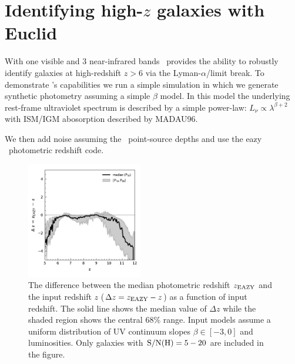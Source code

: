 

\section{Identifying high-$z$ galaxies with Euclid}

With one visible and 3 near-infrared bands \euclid\ provides the ability to robustly identify galaxies at high-redshift $z>6$ via the Lyman-$\alpha$/limit break. To demonstrate \euclid's capabilities we run a simple simulation in which we generate synthetic photometry assuming a simple $\beta$ model. In this model the underlying rest-frame ultraviolet spectrum is described by a simple power-law: $L_{\nu}\propto \lambda^{\beta+2}$ with ISM/IGM abosorption described by MADAU96.

We then add noise assuming the \euclid\ point-source depths and use the {\sc eazy} \insref\ photometric redshift code.



\begin{figure}
	\centering
	\includegraphics[width=0.45\textwidth]{./figures/beta_dz.pdf}
	\caption{The difference between the median photometric redshift $z_{\rm EAZY}$ and the input redshift $z$ ($\Delta z = z_{\rm EAZY} - z$) as a function of input redshift. The solid line shows the median value of $\Delta z$ while the shaded region shows the central 68\% range. Input models assume a uniform distribution of UV continuum slopes $\beta\in[-3,0]$ and luminosities. Only galaxies with ${\rm S/N(H)}=5-20$ are included in the figure.\label{fig:beta_dz}}
\end{figure}

